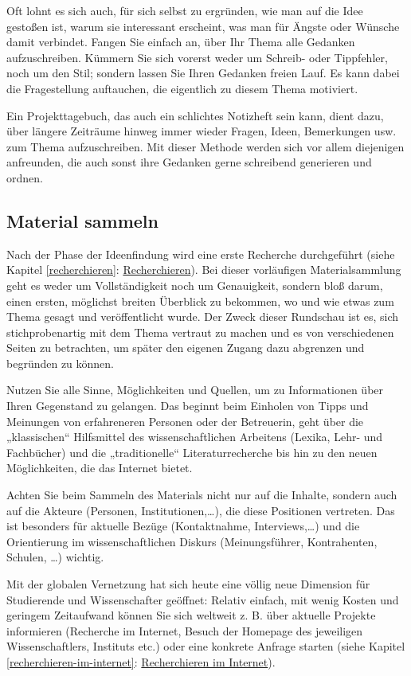 \documentclass[]{book}
\theoremstyle{definition}
\theoremstyle{definition}
\theoremstyle{definition}
\theoremstyle{remark}
\begin{document}
Oft lohnt es sich auch, für sich selbst zu ergründen, wie man auf die
Idee gestoßen ist, warum sie interessant erscheint, was man für Ängste
oder Wünsche damit verbindet. Fangen Sie einfach an, über Ihr Thema alle
Gedanken aufzuschreiben. Kümmern Sie sich vorerst weder um Schreib- oder
Tippfehler, noch um den Stil; sondern lassen Sie Ihren Gedanken freien
Lauf. Es kann dabei die Fragestellung auftauchen, die eigentlich zu
diesem Thema motiviert.

Ein Projekttagebuch, das auch ein schlichtes Notizheft sein kann, dient
dazu, über längere Zeiträume hinweg immer wieder Fragen, Ideen,
Bemerkungen usw. zum Thema aufzuschreiben. Mit dieser Methode werden
sich vor allem diejenigen anfreunden, die auch sonst ihre Gedanken gerne
schreibend generieren und ordnen.

\subsection{Material sammeln}\label{konzipieren-material-sammeln}

Nach der Phase der Ideenfindung wird eine erste Recherche durchgeführt
(siehe Kapitel \ref{recherchieren}:
\protect\hyperlink{recherchieren}{Recherchieren}). Bei dieser
vorläufigen Materialsammlung geht es weder um Vollständigkeit noch um
Genauigkeit, sondern bloß darum, einen ersten, möglichst breiten
Überblick zu bekommen, wo und wie etwas zum Thema gesagt und
veröffentlicht wurde. Der Zweck dieser Rundschau ist es, sich
stichprobenartig mit dem Thema vertraut zu machen und es von
verschiedenen Seiten zu betrachten, um später den eigenen Zugang dazu
abgrenzen und begründen zu können.

Nutzen Sie alle Sinne, Möglichkeiten und Quellen, um zu Informationen
über Ihren Gegenstand zu gelangen. Das beginnt beim Einholen von Tipps
und Meinungen von erfahreneren Personen oder der Betreuerin, geht über
die „klassischen`` Hilfsmittel des wissenschaftlichen Arbeitens (Lexika,
Lehr- und Fachbücher) und die „traditionelle`` Literaturrecherche bis
hin zu den neuen Möglichkeiten, die das Internet bietet.

Achten Sie beim Sammeln des Materials nicht nur auf die Inhalte, sondern
auch auf die Akteure (Personen, Institutionen,\ldots{}), die diese
Positionen vertreten. Das ist besonders für aktuelle Bezüge
(Kontaktnahme, Interviews,\ldots{}) und die Orientierung im
wissenschaftlichen Diskurs (Meinungsführer, Kontrahenten, Schulen,
\ldots{}) wichtig.

Mit der globalen Vernetzung hat sich heute eine völlig neue Dimension
für Studierende und Wissenschafter geöffnet: Relativ einfach, mit wenig
Kosten und geringem Zeitaufwand können Sie sich weltweit z. B. über
aktuelle Projekte informieren (Recherche im Internet, Besuch der
Homepage des jeweiligen Wissenschaftlers, Instituts etc.) oder eine
konkrete Anfrage starten (siehe Kapitel \ref{recherchieren-im-internet}:
\protect\hyperlink{recherchieren-im-internet}{Recherchieren im
Internet}).
\end{document}
